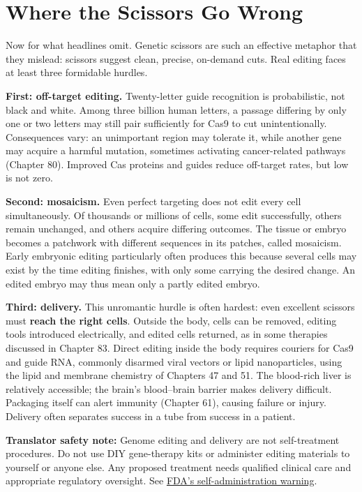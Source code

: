 \section{Where the Scissors Go Wrong}

Now for what headlines omit. Genetic scissors are such an effective metaphor that they mislead: scissors suggest clean, precise, on-demand cuts. Real editing faces at least three formidable hurdles.

\textbf{First: off-target editing.} Twenty-letter guide recognition is probabilistic, not black and white. Among three billion human letters, a passage differing by only one or two letters may still pair sufficiently for Cas9 to cut unintentionally. Consequences vary: an unimportant region may tolerate it, while another gene may acquire a harmful mutation, sometimes activating cancer-related pathways (Chapter 80). Improved Cas proteins and guides reduce off-target rates, but low is not zero.

\textbf{Second: mosaicism.} Even perfect targeting does not edit every cell simultaneously. Of thousands or millions of cells, some edit successfully, others remain unchanged, and others acquire differing outcomes. The tissue or embryo becomes a patchwork with different sequences in its patches, called mosaicism. Early embryonic editing particularly often produces this because several cells may exist by the time editing finishes, with only some carrying the desired change. An edited embryo may thus mean only a partly edited embryo.

\textbf{Third: delivery.} This unromantic hurdle is often hardest: even excellent scissors must \textbf{reach the right cells}. Outside the body, cells can be removed, editing tools introduced electrically, and edited cells returned, as in some therapies discussed in Chapter 83. Direct editing inside the body requires couriers for Cas9 and guide RNA, commonly disarmed viral vectors or lipid nanoparticles, using the lipid and membrane chemistry of Chapters 47 and 51. The blood-rich liver is relatively accessible; the brain's blood--brain barrier makes delivery difficult. Packaging itself can alert immunity (Chapter 61), causing failure or injury. Delivery often separates success in a tube from success in a patient.

\textbf{Translator safety note:} Genome editing and delivery are not self-treatment procedures. Do not use DIY gene-therapy kits or administer editing materials to yourself or anyone else. Any proposed treatment needs qualified clinical care and appropriate regulatory oversight. See \href{https://www.fda.gov/vaccines-blood-biologics/cellular-gene-therapy-products/information-about-self-administration-gene-therapy}{FDA's self-administration warning}.

